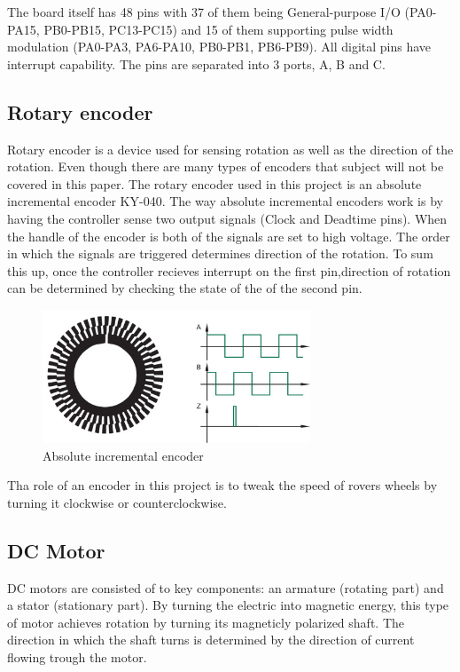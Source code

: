 The board itself has 48 pins with 37 of them being General-purpose I/O (PA0-PA15, PB0-PB15, PC13-PC15) and 15 of them supporting pulse width modulation (PA0-PA3, PA6-PA10, PB0-PB1, PB6-PB9). All digital pins have interrupt capability. The pins are separated into 3 ports, A, B and C. 

\subsection{Rotary encoder}

Rotary encoder is a device used for sensing rotation as well as the direction of the rotation. Even though there are many types of encoders that subject will not be covered in this paper. The rotary encoder used in this project is an absolute incremental encoder KY-040. The way absolute incremental encoders work is by having the controller sense two output signals (Clock and Deadtime pins). When the handle of the encoder is both of the signals are set to high voltage. The order in which the signals are triggered determines direction of the rotation. To sum this up, once the controller recieves interrupt on the first pin,direction of rotation can be determined by checking the state of the of the second pin.


\begin{figure}[htbp]
    \centerline{\includegraphics[width=8cm]{Images/Encoder.jpg}}
    \caption{Absolute incremental encoder}
    \label{fig2}
\end{figure}

Tha role of an encoder in this project is to tweak the speed of rovers wheels by turning it clockwise or counterclockwise.

\subsection{DC Motor}

DC motors are consisted of to key components: an armature (rotating part) and a stator (stationary part). By turning the electric into magnetic energy, this type of motor achieves rotation by turning its magneticly polarized shaft. The direction in which the shaft turns is determined by the direction of current flowing trough the motor. 

